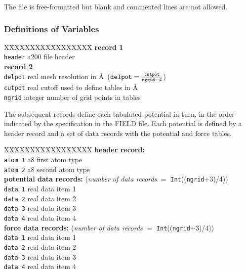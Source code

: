 The file is free-formatted but blank and commented lines are not
allowed.

\subsubsection{Definitions of Variables}

\begin{tabbing}
X\=XXXXXXXX\=XXXXXXXX\=\kill
{\bf record 1} \\
\> {\tt header} \> a200    \> file header \\
{\bf record 2} \\
\> {\tt delpot} \> real    \> mesh resolution in \AA~(${\tt delpot} = \frac{\tt cutpot}{{\tt ngrid}-4}$) \\
\> {\tt cutpot} \> real    \> cutoff used to define tables in \AA \\
\> {\tt ngrid}  \> integer \> number of grid points in tables
\end{tabbing}

The subsequent records define each tabulated potential in turn,
{in the order indicated by the specification in the FIELD file}.
Each potential is defined by a header record and a set of data
records with the potential and force tables.

\begin{tabbing}
X\=XXXXXXXX\=XXXXXXXX\=\kill
{\bf header record:} \\
\> {\tt atom 1} \> a8   \> first atom type \\
\> {\tt atom 2} \> a8   \> second atom type \\
{\bf potential data records:} ({\em number of data records} $=$ {\tt Int}(({\tt ngrid}+3)/4)) \\
\> {\tt data 1} \> real \> data item 1 \\
\> {\tt data 2} \> real \> data item 2 \\
\> {\tt data 3} \> real \> data item 3 \\
\> {\tt data 4} \> real \> data item 4 \\
{\bf force data records:} ({\em number of data records} $=$ {\tt Int}(({\tt ngrid}+3)/4)) \\
\> {\tt data 1} \> real \> data item 1 \\
\> {\tt data 2} \> real \> data item 2 \\
\> {\tt data 3} \> real \> data item 3 \\
\> {\tt data 4} \> real \> data item 4
\end{tabbing}

